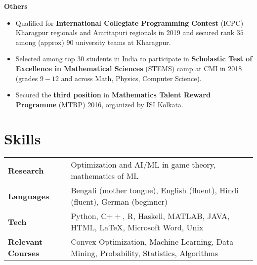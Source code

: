 \vspace{\mygap}
\resumeProjectHeading
{\textbf{Others}}
{}
{
\item 
\begin{itemize}[itemsep=-4pt, parsep=5pt, leftmargin=0.5cm]
\item {}  Qualified for \textbf{International Collegiate Programming Contest} (ICPC) Kharagpur regionals and Amritapuri regionals in 2019 and secured rank $35$ among (approx) $90$ university teams at Kharagpur.
\item Selected among top $30$ students in India to participate in \textbf{Scholastic Test of Excellence in Mathematical Sciences} (STEMS) camp at CMI in 2018 (grades $9-12$ and across Math, Physics, Computer Science).
\item Secured the \textbf{third position} in \textbf{Mathematics Talent Reward Programme} (MTRP) 2016, organized by ISI Kolkata.\end{itemize}}
\resumeSubHeadingListEnd
\vspace{\mygap}


\section{Skills}
\vspace{-2pt}
\begin{tabular*}{\textwidth}{l @{\hskip 0.5in} l}
\textbf{Research} & Optimization and AI/ML in game theory, mathematics of ML\\
\textbf{Languages} & Bengali (mother tongue), English (fluent), Hindi (fluent), German (beginner)\\
\textbf{Tech}  & {Python, C$++$, R, Haskell,  MATLAB, JAVA, HTML, \LaTeX, Microsoft Word, Unix} \\
\textbf{Relevant Courses}
  & {Convex Optimization, Machine Learning, Data Mining, Probability, Statistics, Algorithms} \\
\end{tabular*}
\vspace{-15pt}







